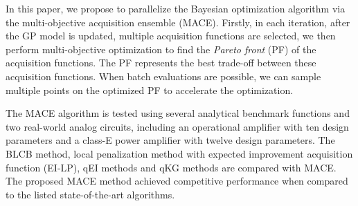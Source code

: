 In this paper, we propose to parallelize the Bayesian optimization algorithm
via the multi-objective acquisition ensemble (MACE). Firstly, in each
iteration, after the GP model is updated, multiple acquisition functions are
selected, we then perform multi-objective optimization to find the \emph{Pareto
front} (PF) of the acquisition functions. The PF represents the best trade-off
between these acquisition functions. When batch evaluations are possible, we
can sample multiple points on the optimized PF to accelerate the optimization.

The MACE algorithm is tested using several analytical benchmark functions and
two real-world analog circuits, including an operational amplifier with ten
design parameters and a class-E power amplifier with twelve design parameters.
The BLCB method, local penalization method with expected improvement
acquisition function (EI-LP), qEI methods and qKG methods are compared with
MACE. The proposed MACE method achieved competitive performance when compared
to the listed state-of-the-art algorithms.
